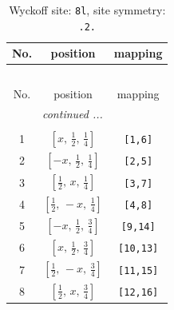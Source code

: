 \documentclass[fleqn,8pt]{jsarticle}
\begin{document}
\begin{longtable}{ccc}
\caption{Wyckoff site: {\tt 8l}, site symmetry: {\tt .2.}}
 \\
 \hline \hline
No. & position & mapping \\ \hline \endfirsthead

\multicolumn{2}{l}{\tablename\ \thetable{}} \\
 \hline \hline
No. & position & mapping \\ \hline \endhead

 \hline \hline
\multicolumn{2}{r}{\footnotesize\it continued ...} \\ \endfoot

 \hline \hline
\multicolumn{2}{r}{} \\ \endlastfoot

1 & $\left[ x,\, \frac{1}{2},\, \frac{1}{4} \right]$ & {\tt [1,6]} \\ \hline
2 & $\left[ - x,\, \frac{1}{2},\, \frac{1}{4} \right]$ & {\tt [2,5]} \\ \hline
3 & $\left[ \frac{1}{2},\, x,\, \frac{1}{4} \right]$ & {\tt [3,7]} \\ \hline
4 & $\left[ \frac{1}{2},\, - x,\, \frac{1}{4} \right]$ & {\tt [4,8]} \\ \hline
5 & $\left[ - x,\, \frac{1}{2},\, \frac{3}{4} \right]$ & {\tt [9,14]} \\ \hline
6 & $\left[ x,\, \frac{1}{2},\, \frac{3}{4} \right]$ & {\tt [10,13]} \\ \hline
7 & $\left[ \frac{1}{2},\, - x,\, \frac{3}{4} \right]$ & {\tt [11,15]} \\ \hline
8 & $\left[ \frac{1}{2},\, x,\, \frac{3}{4} \right]$ & {\tt [12,16]} \\
\end{longtable}
\renewcommand{\arraystretch}{1.2}
\end{document}

